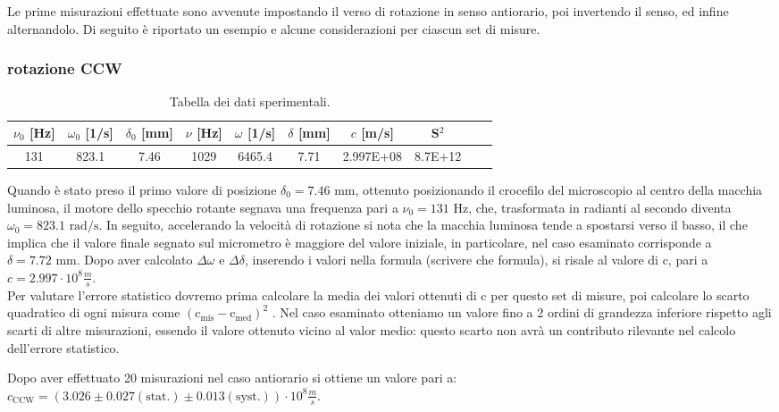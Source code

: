 \documentclass{article}
\begin{document}
Le prime misurazioni effettuate sono avvenute impostando il verso di rotazione in senso antiorario, poi invertendo il senso, ed infine alternandolo. Di seguito è riportato un esempio e alcune considerazioni per ciascun set di misure.

\subsubsection{rotazione CCW}
\begin{table}[h!]
    \centering
    
    \begin{tabular}{|c|c|c|c|c|c|c|c|c|c|} 
        \hline
        $\nu_0$ [Hz] & $\omega_0$ [1/s] & $\delta_0$ [mm] & $\nu$ [Hz] & $\omega$ [1/s] & $\delta$ [mm] &  $c$ [m/s] & S$^2$\\ 
        \hline
        131 & 823.1 & 7.46 & 1029 & 6465.4 & 7.71 & 2.997E+08& 8.7E+12\\ 
        \hline
    \end{tabular}
    \caption{Tabella dei dati sperimentali.}
    \label{tab:dati}
\end{table}
Quando è stato preso il primo valore di posizione \(\delta_0 = 7.46 \text{ mm}\), ottenuto posizionando il crocefilo del microscopio al centro della macchia luminosa, il motore dello specchio rotante segnava una frequenza pari a \(\nu_0 = 131 \text{ Hz}\), che, trasformata in radianti al secondo diventa \(\omega_0 = 823.1 \text{ rad/s}\). 
In seguito, accelerando la velocità di rotazione si nota che la macchia luminosa tende a spostarsi verso il basso, il che implica che il valore finale segnato sul micrometro è maggiore del valore iniziale, in particolare, nel caso esaminato corrisponde a \(\delta=7.72\text{ mm}\). 
Dopo aver calcolato \(\Delta\omega\) e \(\Delta\delta\), inserendo i valori nella formula (scrivere che formula), si risale al valore di c, pari a \(c=2.997\cdot10^8\frac{m}{s}\). \\
Per valutare l'errore statistico dovremo prima calcolare la media dei valori ottenuti di \(\text{c}\) per questo set di misure, poi calcolare lo scarto quadratico di ogni misura come \((\text{c}_\text{mis} -\text{c}_\text{med})^2\) . 
Nel caso esaminato otteniamo un valore fino a 2 ordini di grandezza inferiore rispetto agli scarti di altre misurazioni, essendo il valore ottenuto vicino al valor medio: questo scarto non avrà un contributo rilevante nel calcolo dell'errore statistico.

Dopo aver effettuato 20 misurazioni nel caso antiorario si ottiene un valore pari a: \\
\(c_\text{CCW}=(3.026\pm 0.027 (\text{stat.}) \pm 0.013(\text{syst.}))\cdot 10^8 \frac{m}{s}\).
\end{document}
